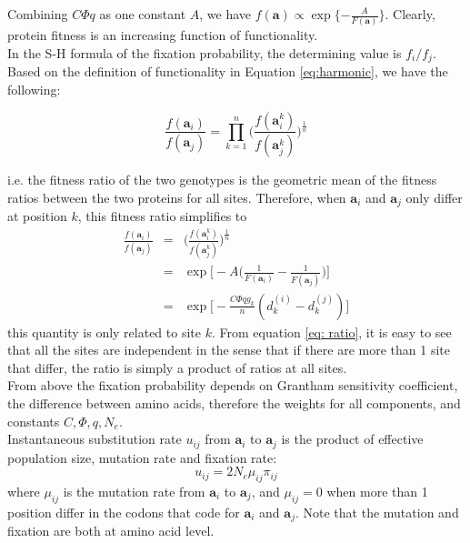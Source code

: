 \documentclass[13pt]{article}
\begin{document}
Combining $C\Phi q$ as one constant $A$, we have
$f(\mathbf{a}) \propto \exp\{-\frac{A}{F(\mathbf{a})}\}$.
Clearly, protein fitness is an increasing function of functionality.\\


In the S-H formula of the fixation probability, the determining value is $f_i/f_j$.
Based on the definition of functionality in Equation \ref{eq:harmonic}, we have the following:

\begin{equation}
\frac{f(\mathbf{a}_i)}{f(\mathbf{a}_j)} = \prod_{k=1}^n\Big( \frac{f(\mathbf{a}_i^k)}{f(\mathbf{a}_j^k)}\Big)^{\frac{1}{n}}
\end{equation}


i.e. the fitness ratio of the two genotypes is the geometric mean of the fitness ratios between the two proteins for all sites. Therefore, when $\mathbf{a}_i$ and $\mathbf{a}_j$ only differ at position $k$, this fitness ratio simplifies to  
\begin{eqnarray}
\frac{f(\mathbf{a}_i)}{f(\mathbf{a}_j)} & = & \Big( \frac{f(\mathbf{a}_i^k)}{f(\mathbf{a}_j^k)}\Big)^{\frac{1}{n}}\\
 & = &\exp \Big[-A\Big( \frac{1}{F(\mathbf{a}_i )} - \frac{1}{F(\mathbf{a}_j )}\Big)\Big] \nonumber\\
& = & \exp\Big[ -\frac{C\Phi q g_k}{n}(d_k^{(i)} - d_k^{(j)})\Big] \label{eq: ratio}
\end{eqnarray}
\noindent
this quantity is only related to site $k$. From equation \ref{eq: ratio}, it is easy to see that all the sites are independent in the sense that if there are more than 1 site that differ, the ratio is simply a product of ratios at all sites. \\

From above the fixation probability depends on Grantham sensitivity coefficient, the difference between amino acids, therefore the weights for all components, and constants $C, \Phi, q, N_e$.\\

Instantaneous substitution rate $u_{ij}$ from $\mathbf{a}_i$ to $\mathbf{a}_j$ is the product of effective population size, mutation rate and fixation rate:
\begin{equation}
u_{ij} = 2N_e \mu_{ij} \pi_{ij}
\label{eq:subrate}
\end{equation}
where $\mu_{ij}$ is the mutation rate from $\mathbf{a}_i$ to $\mathbf{a}_j$, and $\mu_{ij} = 0$ when more than 1 position differ in the codons that code for $\mathbf{a}_i$ and $\mathbf{a}_j$. Note that the mutation and fixation are both at amino acid level. \\
\end{document}
